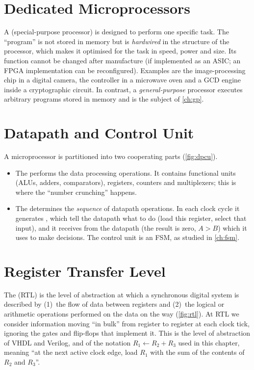 
\section{Dedicated Microprocessors}
A  (special-purpose processor) is designed to perform one specific task. The ``program'' is not stored in memory but is \emph{hardwired} in the structure of the processor, which makes it optimised for the task in speed, power and size. Its function cannot be changed after manufacture (if implemented as an ASIC; an FPGA implementation can be reconfigured). Examples are the image-processing chip in a digital camera, the controller in a microwave oven and a GCD engine inside a cryptographic circuit. In contrast, a \emph{general-purpose} processor executes arbitrary programs stored in memory and is the subject of \cref{ch:gp}.

\section{Datapath and Control Unit}\label{sec:dpcu}
A microprocessor is partitioned into two cooperating parts (\cref{fig:dpcu}).
\begin{itemize}
  \item The  performs the data processing operations. It contains functional units (ALUs, adders, comparators), registers, counters and multiplexers; this is where the ``number crunching'' happens.
  \item The  determines the \emph{sequence} of datapath operations. In each clock cycle it generates , which tell the datapath what to do (load this register, select that input), and it receives  from the datapath (the result is zero, $A>B$) which it uses to make decisions. The control unit is an FSM, as studied in \cref{ch:fsm}.
\end{itemize}


\section{Register Transfer Level}\label{sec:rtl}
The  (RTL) is the level of abstraction at which a synchronous digital system is described by (1)~the flow of data between registers and (2)~the logical or arithmetic operations performed on the data on the way (\cref{fig:rtl}). At RTL we consider information moving ``in bulk'' from register to register at each clock tick, ignoring the gates and flip-flops that implement it. This is the level of abstraction of VHDL and Verilog, and of the notation $R_1\leftarrow R_2+R_3$ used in this chapter, meaning ``at the next active clock edge, load $R_1$ with the sum of the contents of $R_2$ and $R_3$''.

